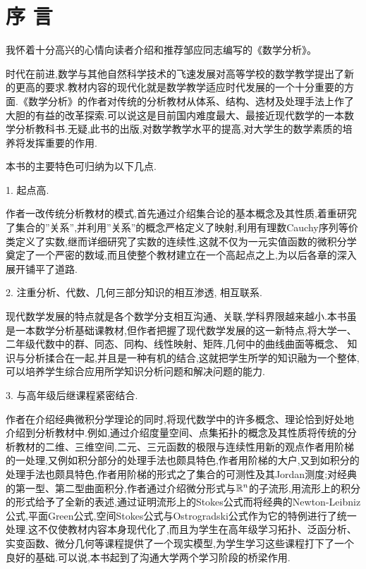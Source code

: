\chapter{序 言}

\begingroup
\fangsong

我怀着十分高兴的心情向读者介绍和推荐邹应同志编写的《数学分析》。

时代在前进,数学与其他自然科学技术的飞速发展对高等学校的数学教学提出了新的更高的要求.教材内容的现代化就是数学教学适应时代发展的一个十分重要的方面.《数学分析》的作者对传统的分析教材从体系、结构、选材及处理手法上作了大胆的有益的改革探索.可以说这是目前国内难度最大、最接近现代数学的一本数学分析教科书.无疑,此书的出版,对数学教学水平的提高,对大学生的数学素质的培养将发挥重要的作用.

本书的主要特色可归纳为以下几点.

1. 起点高.

作者一改传统分析教材的模式,首先通过介绍集合论的基本概念及其性质,着重研究了集合的''关系'',并利用''关系''的概念严格定义了映射,利用有理数Cauchy序列等价类定义了实数,继而详细研究了实数的连续性,这就不仅为一元实值函数的微积分学奠定了一个严密的数域,而且使整个教材建立在一个高起点之上,为以后各章的深入展开铺平了道路.


2. 注重分析、代数、几何三部分知识的相互渗透, 相互联系.

现代数学发展的特点就是各个数学分支相互沟通、关联,学科界限越来越小.本书虽是一本数学分析基础课教材,但作者把握了现代数学发展的这一新特点,将大学一、二年级代数中的群、同态、同构、线性映射、矩阵,几何中的曲线曲面等概念、
知识与分析揉合在一起,并且是一种有机的结合,这就把学生所学的知识融为一个整体,可以培养学生综合应用所学知识分析问题和解决问题的能力.

3. 与高年级后继课程紧密结合.

作者在介绍经典微积分学理论的同时,将现代数学中的许多概念、理论恰到好处地介绍到分析教材中.例如,通过介绍度量空间、点集拓扑的概念及其性质将传统的分析教材的二维、三维空间,二元、三元函数的极限与连续性用新的观点作者用阶梯的一处理,又例如积分部分的处理手法也颇具特色,作者用阶梯的大户,又到如积分的处理手法也颇具特色,作者用阶梯的形式之了集合的可测性及其Jordan测度;对经典的第一型、第二型曲面积分,作者通过介绍微分形式与$\mathbb{R}^n$的子流形,用流形上的积分的形式给予了全新的表述,通过证明流形上的Stokes公式而将经典的Newton-Leibniz公式,平面Green公式,空间Stokes公式与Ostrogradski公式作为它的特例进行了统一处理.这不仅使教材内容本身现代化了,而且为学生在高年级学习拓扑、泛函分析、实变函数、微分几何等课程提供了一个现实模型,为学生学习这些课程打下了一个良好的基础.可以说,本书起到了沟通大学两个学习阶段的桥梁作用.

